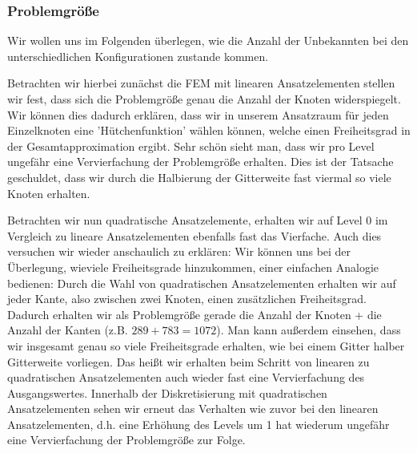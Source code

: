 \subsubsection*{Problemgröße}
Wir wollen uns im Folgenden überlegen, wie die Anzahl der Unbekannten bei den unterschiedlichen Konfigurationen zustande kommen. 
\begin{figure}[H]
	\centering
\end{figure}
Betrachten wir hierbei zunächst die FEM mit linearen Ansatzelementen stellen wir fest, dass sich die Problemgröße genau die Anzahl der Knoten widerspiegelt.
Wir können dies dadurch erklären, dass wir in unserem Ansatzraum für jeden Einzelknoten eine 'Hütchenfunktion' wählen können, welche einen Freiheitsgrad in der Gesamtapproximation ergibt.
Sehr schön sieht man, dass wir pro Level ungefähr eine Vervierfachung der Problemgröße erhalten. Dies ist der Tatsache geschuldet, dass wir durch die Halbierung der Gitterweite fast viermal so viele Knoten erhalten.

Betrachten wir nun quadratische Ansatzelemente, erhalten wir auf Level 0 im Vergleich zu lineare Ansatzelementen ebenfalls fast das Vierfache. Auch dies versuchen wir wieder anschaulich zu erklären: 
Wir können uns bei der Überlegung, wieviele Freiheitsgrade hinzukommen, einer einfachen Analogie bedienen: 
Durch die Wahl von quadratischen Ansatzelementen erhalten wir auf jeder Kante, also zwischen zwei Knoten, einen zusätzlichen Freiheitsgrad. Dadurch erhalten wir als Problemgröße gerade die Anzahl der Knoten + die Anzahl der Kanten (z.B. $289 +783 = 1072$). Man kann außerdem einsehen, dass wir insgesamt genau so viele Freiheitsgrade erhalten, wie bei einem Gitter halber Gitterweite vorliegen. Das heißt wir erhalten beim Schritt von linearen zu quadratischen Ansatzelementen auch wieder fast eine Vervierfachung des Ausgangswertes. Innerhalb der Diskretisierung mit quadratischen Ansatzelementen sehen wir erneut das Verhalten wie zuvor bei den linearen Ansatzelementen, d.h. eine Erhöhung des Levels um 1 hat wiederum  ungefähr eine Vervierfachung der Problemgröße zur Folge.

